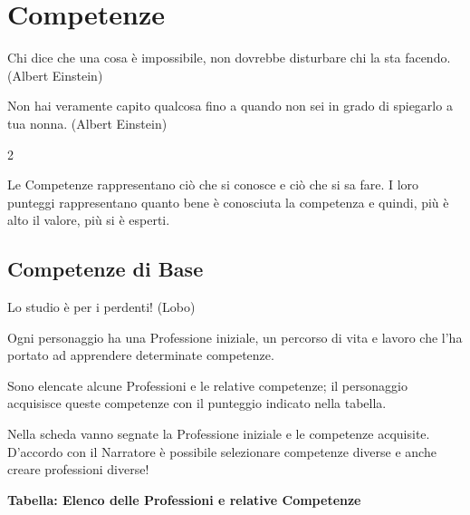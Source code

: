 \section{Competenze}

\begin{enfasi}{
Chi dice che una cosa è impossibile, non dovrebbe disturbare chi la sta facendo. (Albert Einstein)

\medskip
Non hai veramente capito qualcosa fino a quando non sei in grado di spiegarlo a tua nonna. (Albert Einstein)}\end{enfasi}

\begin{multicols}{2}

Le Competenze rappresentano ciò che si conosce e ciò che si sa fare. I loro punteggi rappresentano quanto bene è conosciuta la competenza e quindi, più è alto il valore, più si è esperti.

\subsection{Competenze di Base}\label{competenzebase}

\begin{enfasi}{
Lo studio è per i perdenti! (Lobo) }\end{enfasi}


Ogni personaggio ha una Professione iniziale, un percorso di vita e lavoro che l'ha portato ad apprendere determinate competenze.

Sono elencate alcune Professioni e le relative competenze; il personaggio acquisisce queste competenze con il punteggio indicato nella tabella.

Nella scheda vanno segnate la Professione iniziale e le competenze acquisite. D'accordo con il Narratore è possibile selezionare competenze diverse e anche creare professioni diverse!

\end{multicols}

\textbf{Tabella: Elenco delle Professioni e relative Competenze}

\medskip

